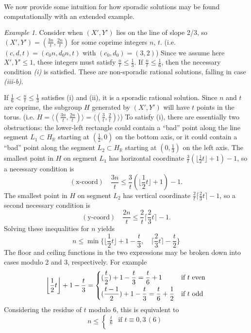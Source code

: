 \documentclass[12pt,letterpaper, reqno]{amsart}
\theoremstyle{definition}
\theoremstyle{remark}
\newtheorem{exa}[thm]{Example}
\newcommand{\RR}{\ensuremath{\mathbb{R}}}
\newcommand{\floor}[1]{\lfloor{#1}\rfloor}
\newcommand{\bfloor}[1]{\bigg\lfloor{#1}\bigg\rfloor}
\newcommand{\ceil}[1]{\lceil{#1}\rceil}
\newcommand{\bceil}[1]{\bigg\lceil{#1}\bigg\rceil}
\begin{document}
We now provide some intuition for how sporadic solutions may be found computationally with an extended example.

\begin{exa}
Consider when $(X',Y')$ lies on the line of slope 2/3, so $(X',Y') = (\frac{3n}{t},\frac{2n}{t})$ for some coprime integers $n$, $t$. (i.e. $(c,d,t) = (c_0 n,d_0n,t)$ with $(c_0,d_0) = (3,2)$) Since we assume here $X',Y'\leq 1$, these integers must satisfy $\frac{n}{t} \leq  \frac13$.
If $\frac{n}t \leq \frac16$, then the necessary condition {\it (i)} is satisfied. These are non-sporadic rational solutions, falling in case {\it (iii-b)}. 

If $\frac16 < \frac{n}{t} \leq \frac13$ satisfies (i) and (ii), it is a sporadic rational solution. 
Since $n$ and $t$ are coprime, the subgroup $H$ generated by $(X',Y')$ will have $t$ points in the torus. (i.e. $H = \langle (\frac{3n}t,\frac{2n}t)\rangle =  \langle (\frac{3}t,\frac{2}t)\rangle$) 
To satisfy (i), there are essentially two obstructions: the lower-left rectangle could contain a ``bad'' point along the line segment $L_1 \subset H_\RR$ starting at $(\frac12,0)$ on the bottom axis, or it could contain a ``bad'' point along the segment $L_2 \subset H_\RR$ starting at $(0,\frac13)$ on the left axis. 
The smallest point in $H$ on segment $L_1$ has horizontal coordinate $\frac{3}{t}(\floor{\frac12 t}+1) - 1$, so a necessary condition is 
\[ (\text{x-coord}) \quad \frac{3n}{t} \leq \frac{3}{t}(\floor{\frac12 t}+1) - 1 .\]
The smallest point in $H$ on segment $L_2$ has vertical coordinate $\frac{2}{t}\ceil{\frac23 t} - 1$, so a second necessary condition is
\[ (\text{y-coord}) \quad \frac{2n}{t} \leq \frac{2}{t}\ceil{\frac23 t} - 1.\]
Solving these inequalities for $n$ yields
\[ n \leq  \min\bigg\{
\displaystyle \bfloor{\frac12 t} + 1 - \frac{t}{3} ,\quad
 \bceil{\frac23 t} - \frac{t}{2}
\bigg\}\]
The floor and ceiling functions in the two expressions may be broken down into cases modulo 2 and 3, respectively. For example
\[ \bfloor{\frac12 t} + 1 - \frac{t}{3} = \begin{dcases}
\displaystyle (\frac{t}2) + 1 - \frac{t}{3} = \frac{t}{6}+1 & \text{if }t \text{ even}\\
\displaystyle(\frac{t-1}2) + 1 - \frac{t}{3} = \frac{t}{6}+\frac12 & \text{if } t \text{ odd}
\end{dcases}\]
Considering the residue of $t$ modulo 6, this is equivalent to 
\[ n \leq \begin{cases}
\frac{t}6 & \text{if }t\equiv 0,3 \,(6)\\

\end{cases}\]
\end{exa}
\end{document}
